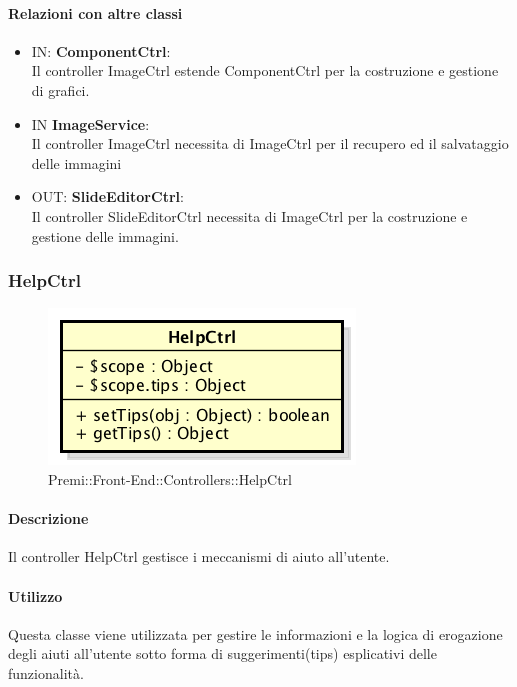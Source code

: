 	\paragraph{Relazioni con altre classi}
	\begin{itemize}
 	\item IN: \textbf{ComponentCtrl}:\\
	 	Il controller ImageCtrl estende ComponentCtrl per la costruzione e gestione di grafici.
	\item IN \textbf{ImageService}:\\
		Il controller ImageCtrl necessita di ImageCtrl per il recupero ed il salvataggio delle immagini
	\item OUT: \textbf{SlideEditorCtrl}:\\
		Il controller SlideEditorCtrl necessita di ImageCtrl per la costruzione e gestione delle immagini. 	
	\end{itemize}

\newpage

\subsubsection{HelpCtrl}
\begin{figure}[h]
	\centering
	\includegraphics[width=0.4\linewidth]{img/premi_front_end_controllers_helpctrl}
	\caption[Premi::Front-End::Controllers::HelpCtrl]{Premi::Front-End::Controllers::HelpCtrl}
\end{figure}
      \paragraph{Descrizione}
	Il controller HelpCtrl gestisce i meccanismi di aiuto all'utente.
	
	\paragraph{Utilizzo}
	Questa classe viene utilizzata per gestire le informazioni e la logica di erogazione degli aiuti all'utente sotto forma di suggerimenti(tips) esplicativi delle funzionalità.
	
